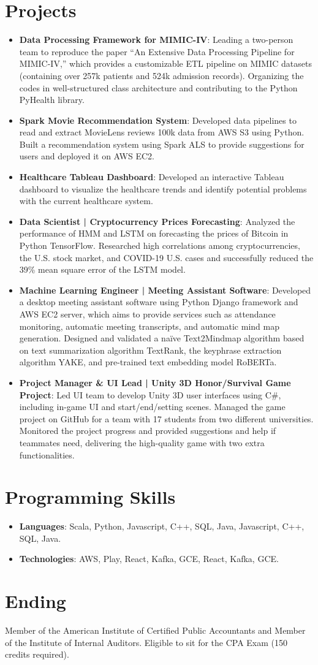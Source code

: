 \documentclass[letterpaper,11pt]{article}
\newcommand{\resumeItem}[2]{
  \item\small{
    \textbf{#1}{: #2 \vspace{-2pt}}
  }
}
\newcommand{\resumeSubItem}[2]{\resumeItem{#1}{#2}\vspace{-4pt}}
\newcommand{\resumeSubHeadingListStart}{\begin{itemize}[leftmargin=*]}
\newcommand{\resumeSubHeadingListEnd}{\end{itemize}}
\begin{document}
\section{Projects}
  \resumeSubHeadingListStart
    \resumeSubItem{Data Processing Framework for MIMIC-IV}
      {Leading a two-person team to reproduce the paper “An Extensive Data Processing Pipeline for MIMIC-IV,” which provides a customizable ETL pipeline on MIMIC datasets (containing over 257k patients and 524k admission records). Organizing the codes in well-structured class architecture and contributing to the Python PyHealth library.}
    \resumeSubItem{Spark Movie Recommendation System}
      {Developed data pipelines to read and extract MovieLens reviews 100k data from AWS S3 using Python. Built a recommendation system using Spark ALS to provide suggestions for users and deployed it on AWS EC2.}
    \resumeSubItem{Healthcare Tableau Dashboard}
      {Developed an interactive Tableau dashboard to visualize the healthcare trends and identify potential problems with the current healthcare system.}
    \resumeSubItem{Data Scientist | Cryptocurrency Prices Forecasting}
      {Analyzed the performance of HMM and LSTM on forecasting the prices of Bitcoin in Python TensorFlow. Researched high correlations among cryptocurrencies, the U.S. stock market, and COVID-19 U.S. cases and successfully reduced the 39\% mean square error of the LSTM model.}
    \resumeSubItem{Machine Learning Engineer | Meeting Assistant Software}
      {Developed a desktop meeting assistant software using Python Django framework and AWS EC2 server, which aims to provide services such as attendance monitoring, automatic meeting transcripts, and automatic mind map generation. Designed and validated a naïve Text2Mindmap algorithm based on text summarization algorithm TextRank, the keyphrase extraction algorithm YAKE, and pre-trained text embedding model RoBERTa.}
    \resumeSubItem{Project Manager \& UI Lead | Unity 3D Honor/Survival Game Project}
      {Led UI team to develop Unity 3D user interfaces using C\#, including in-game UI and start/end/setting scenes. Managed the game project on GitHub for a team with 17 students from two different universities. Monitored the project progress and provided suggestions and help if teammates need, delivering the high-quality game with two extra functionalities.}
  \resumeSubHeadingListEnd
  
\section{Programming Skills}
 \resumeSubHeadingListStart
  \resumeSubItem{Languages}
    {Scala, Python, Javascript, C++, SQL, Java, Javascript, C++, SQL, Java.}
  \resumeSubItem{Technologies}
    {AWS, Play, React, Kafka, GCE, React, Kafka, GCE.}
 \resumeSubHeadingListEnd

\section{Ending}
Member of the American Institute of Certified Public Accountants and Member of the Institute of Internal Auditors. Eligible to sit for the CPA Exam (150 credits required).
\end{document}
